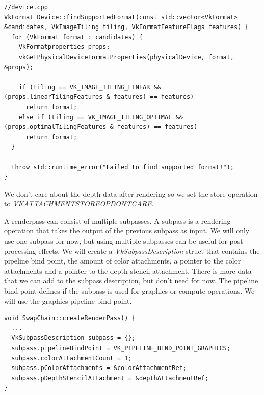 \documentclass[12pt]{report} \usepackage{preamble}
\begin{document}
\begin{lstlisting}[Language=C++]
//device.cpp
VkFormat Device::findSupportedFormat(const std::vector<VkFormat> &candidates, VkImageTiling tiling, VkFormatFeatureFlags features) {
  for (VkFormat format : candidates) {
    VkFormatproperties props;
    vkGetPhysicalDeviceFormatProperties(physicalDevice, format, &props);

    if (tiling == VK_IMAGE_TILING_LINEAR && (props.linearTilingFeatures & features) == features)
      return format;
    else if (tiling == VK_IMAGE_TILING_OPTIMAL && (props.optimalTilingFeatures & features) == features)
      return format;
  }

  throw std::runtime_error("Failed to find supported format!");
}
\end{lstlisting}

We don't care about the depth data after rendering so we set the store operation to
\textit{VK\textunderscore ATTACHMENT\textunderscore STORE\textunderscore OP\textunderscore DONT\textunderscore CARE}.

A renderpass can consist of multiple subpasses. A subpass is a rendering operation that takes the output of the previous
subpass as input. We will only use one subpass for now, but using multiple subpasses can be useful for post processing
effects. We will create a \textit{VkSubpassDescription} struct that contains the pipeline bind point, the amount of color
attachments, a pointer to the color attachments and a pointer to the depth stencil attachment. There is more data that
we can add to the subpass description, but don't need for now. The pipeline bind point defines if the subpass is used
for graphics or compute operations. We will use the graphics pipeline bind point.

\begin{lstlisting}[Language=C++]
void SwapChain::createRenderPass() {
  ...
  VkSubpassDescription subpass = {};
  subpass.pipelineBindPoint = VK_PIPELINE_BIND_POINT_GRAPHICS;
  subpass.colorAttachmentCount = 1;
  subpass.pColorAttachments = &colorAttachmentRef;
  subpass.pDepthStencilAttachment = &depthAttachmentRef;
}
\end{lstlisting}
\end{document}
